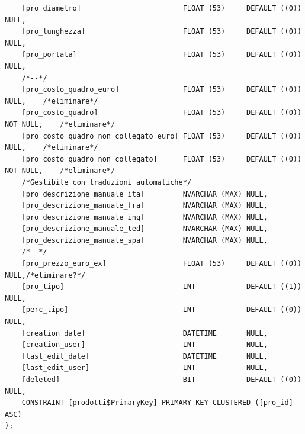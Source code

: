 \documentclass[12pt]{article}
\begin{document}
\begin{lstlisting}
    [pro_diametro]                        FLOAT (53)     DEFAULT ((0)) NULL,
    [pro_lunghezza]                       FLOAT (53)     DEFAULT ((0)) NULL,
    [pro_portata]                         FLOAT (53)     DEFAULT ((0)) NULL,
    /*--*/
    [pro_costo_quadro_euro]               FLOAT (53)     DEFAULT ((0)) NULL,    /*eliminare*/
    [pro_costo_quadro]                    FLOAT (53)     DEFAULT ((0)) NOT NULL,    /*eliminare*/
    [pro_costo_quadro_non_collegato_euro] FLOAT (53)     DEFAULT ((0)) NULL,    /*eliminare*/
    [pro_costo_quadro_non_collegato]      FLOAT (53)     DEFAULT ((0)) NOT NULL,    /*eliminare*/
    /*Gestibile con traduzioni automatiche*/
    [pro_descrizione_manuale_ita]         NVARCHAR (MAX) NULL, 
    [pro_descrizione_manuale_fra]         NVARCHAR (MAX) NULL,
    [pro_descrizione_manuale_ing]         NVARCHAR (MAX) NULL,
    [pro_descrizione_manuale_ted]         NVARCHAR (MAX) NULL,
    [pro_descrizione_manuale_spa]         NVARCHAR (MAX) NULL,
    /*--*/
    [pro_prezzo_euro_ex]                  FLOAT (53)     DEFAULT ((0)) NULL,/*eliminare?*/
    [pro_tipo]                            INT            DEFAULT ((1)) NULL,
    [perc_tipo]                           INT            DEFAULT ((0)) NULL,
    [creation_date]                       DATETIME       NULL,
    [creation_user]                       INT            NULL,
    [last_edit_date]                      DATETIME       NULL,
    [last_edit_user]                      INT            NULL,
    [deleted]                             BIT            DEFAULT ((0)) NULL,
    CONSTRAINT [prodotti$PrimaryKey] PRIMARY KEY CLUSTERED ([pro_id] ASC)
);
\end{lstlisting}
\end{document}
